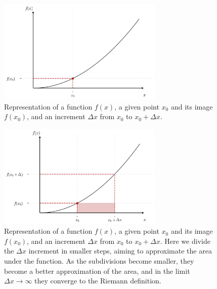 \documentclass{book}
\begin{document}
\begin{figure}[ht]
    \centering
    \includegraphics[width=0.7\textwidth]{figures/appendix/integrals_1.png}
    \caption{Representation of a function $f(x)$, a given point $x_0$ and its image $f(x_0)$, and an increment $\Delta x$ from $x_0$ to $x_0 + \Delta x$.}
    \label{fig:integrals_1}
\end{figure}

\begin{figure}[ht]
    \centering
    \includegraphics[width=0.7\textwidth]{figures/appendix/integrals_2.png}
    \caption{Representation of a function $f(x)$, a given point $x_0$ and its image $f(x_0)$, and an increment $\Delta x$ from $x_0$ to $x_0 + \Delta x$. Here we divide the $\Delta x$ increment in smaller steps, aiming to approximate the area under the function. As the subdivisions become smaller, they become a better approximation of the area, and in the limit $\Delta x \rightarrow \infty$ they converge to the Riemann definition.}
    \label{fig:integrals_2}
\end{figure}
\end{document}

